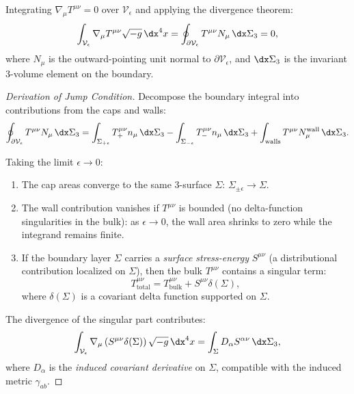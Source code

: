 \begin{proposition}
\label{prop:integral_conservation}
Integrating $\nabla_\mu T^{\mu\nu} = 0$ over $\mathcal{V}_\epsilon$ and applying the divergence theorem:
\begin{equation}
\label{eq:integral_conservation}
\int_{\mathcal{V}_\epsilon} \nabla_\mu T^{\mu\nu} \sqrt{-g} \, \dx^4 x = \oint_{\partial \mathcal{V}_\epsilon} T^{\mu\nu} N_\mu \, \dx \Sigma_3 = 0,
\end{equation}
where $N_\mu$ is the outward-pointing unit normal to $\partial \mathcal{V}_\epsilon$, and $\dx \Sigma_3$ is the invariant 3-volume element on the boundary.
\end{proposition}

\begin{proof}[Derivation of Jump Condition]
Decompose the boundary integral into contributions from the caps and walls:
\begin{equation}
\label{eq:boundary_decomposition}
\oint_{\partial \mathcal{V}_\epsilon} T^{\mu\nu} N_\mu \, \dx \Sigma_3 = \int_{\Sigma_{+\epsilon}} T^{\mu\nu}_{+} n_\mu \, \dx \Sigma_3 - \int_{\Sigma_{-\epsilon}} T^{\mu\nu}_{-} n_\mu \, \dx \Sigma_3 + \int_{\text{walls}} T^{\mu\nu} N^{\text{wall}}_\mu \, \dx \Sigma_3.
\end{equation}

Taking the limit $\epsilon \to 0$:
\begin{enumerate}
    \item The cap areas converge to the same 3-surface $\Sigma$: $\Sigma_{\pm\epsilon} \to \Sigma$.
    \item The wall contribution vanishes if $T^{\mu\nu}$ is bounded (no delta-function singularities in the bulk): as $\epsilon \to 0$, the wall area shrinks to zero while the integrand remains finite.
    \item If the boundary layer $\Sigma$ carries a \emph{surface stress-energy} $S^{\mu\nu}$ (a distributional contribution localized on $\Sigma$), then the bulk $T^{\mu\nu}$ contains a singular term:
    \begin{equation}
    \label{eq:singular_stress}
    T^{\mu\nu}_{\text{total}} = T^{\mu\nu}_{\text{bulk}} + S^{\mu\nu} \delta(\Sigma),
    \end{equation}
    where $\delta(\Sigma)$ is a covariant delta function supported on $\Sigma$.
\end{enumerate}

The divergence of the singular part contributes:
\begin{equation}
\label{eq:singular_divergence}
\int_{\mathcal{V}_\epsilon} \nabla_\mu \left( S^{\mu\nu} \delta(\Sigma) \right) \sqrt{-g} \, \dx^4 x = \int_\Sigma D_\alpha S^{\alpha\nu} \, \dx \Sigma_3,
\end{equation}
where $D_\alpha$ is the \emph{induced covariant derivative} on $\Sigma$, compatible with the induced metric $\gamma_{ab}$.


\end{proof}
